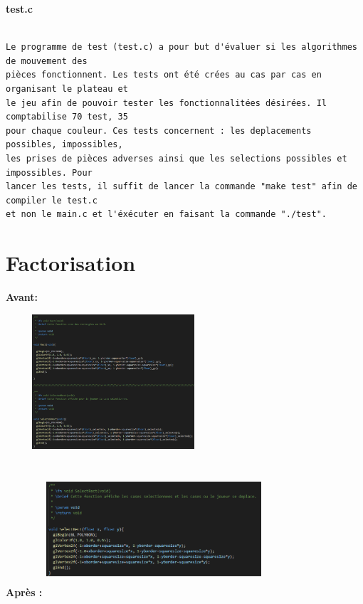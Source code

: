 \documentclass[a4paper]{article}
\begin{document}
\large\bf{test.c}

\begin{verbatim}

Le programme de test (test.c) a pour but d'évaluer si les algorithmes de mouvement des 
pièces fonctionnent. Les tests ont été crées au cas par cas en organisant le plateau et 
le jeu afin de pouvoir tester les fonctionnalitées désirées. Il comptabilise 70 test, 35
pour chaque couleur. Ces tests concernent : les deplacements possibles, impossibles, 
les prises de pièces adverses ainsi que les selections possibles et impossibles. Pour 
lancer les tests, il suffit de lancer la commande "make test" afin de compiler le test.c 
et non le main.c et l'éxécuter en faisant la commande "./test". 

\end{verbatim}

\section{Factorisation }

\large\bf{Avant:}
\bigbreak

\includegraphics[width = 8cm, height = 5cm]{fact_avant.png}
\bigbreak

\large\bf{Après :}
\bigbreak
\includegraphics[width = 8cm, height = 5cm]{fact_new.png}
\end{document}
